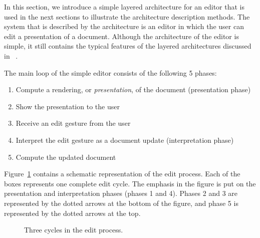 In this section, we introduce a simple layered architecture for an editor that is used in the next sections to illustrate the architecture description methods. The system that is described by the architecture is an editor in which the user can edit a presentation of a document. Although the architecture of the editor is simple, it still contains the typical features of the layered architectures discussed in~\cite{architecture} . 


The main loop of the simple editor consists of the following 5 phases: 
 \begin{enumerate}
 \item Compute a rendering, or {\it presentation}, of the document  (presentation phase)
 \item Show the presentation to the user
 \item Receive an edit gesture from the user
 \item Interpret the edit gesture as a document update (interpretation phase)
 \item Compute the updated document
 \end{enumerate} 

Figure~\ref{simpleeditprocess} contains a schematic representation of the edit process. Each of the boxes represents one complete edit cycle. The emphasis in the figure is put on the presentation and interpretation phases (phases 1 and 4). Phases 2 and 3 are represented by the dotted arrows at the bottom of the figure, and phase 5 is represented by the dotted arrows at the top.

\begin{figure}
\begin{small}
\begin{center}
\begin{center}
\begin{scriptsize}
\end{scriptsize}
\end{center}\caption{Three cycles in the edit process.}\label{simpleeditprocess} 
\end{center}
\end{small}
\end{figure}

